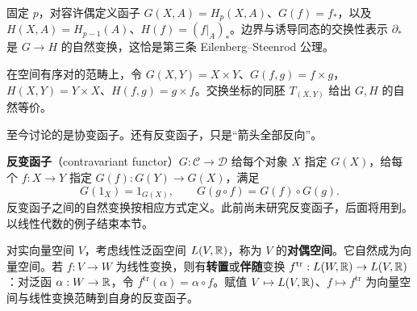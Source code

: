 固定 $p$，对容许偶定义函子 $G(X,A)=H_p(X,A)$、$G(f)=f_*$，以及 $H(X,A)=H_{p-1}(A)$、$H(f)=(f|_A)_*$。边界与诱导同态的交换性表示 $\partial_*$ 是 $G\to H$ 的自然变换，这恰是第三条 Eilenberg--Steenrod 公理。

在空间有序对的范畴上，令 $G(X,Y)=X\times Y$、$G(f,g)=f\times g$，$H(X,Y)=Y\times X$、$H(f,g)=g\times f$。交换坐标的同胚 $T_{(X,Y)}$ 给出 $G,H$ 的自然等价。

至今讨论的是协变函子。还有反变函子，只是“箭头全部反向”。

\textbf{反变函子}（contravariant functor）$G:\mathcal C\to\mathcal D$ 给每个对象 $X$ 指定 $G(X)$，给每个 $f:X\to Y$ 指定 $G(f):G(Y)\to G(X)$，满足
\[
G(1_X)=1_{G(X)},\qquad G(g\circ f)=G(f)\circ G(g).
\]
反变函子之间的自然变换按相应方式定义。此前尚未研究反变函子，后面将用到。以线性代数的例子结束本节。

对实向量空间 $V$，考虑线性泛函空间 $L(V,\mathbb{R})$，称为 $V$ 的\textbf{对偶空间}。它自然成为向量空间。若 $f:V\to W$ 为线性变换，则有\textbf{转置}或\textbf{伴随}变换 $f^{\mathrm{tr}}:L(W,\mathbb{R})\to L(V,\mathbb{R})$：对泛函 $\alpha:W\to\mathbb{R}$，令 $f^{\mathrm{tr}}(\alpha)=\alpha\circ f$。赋值 $V\mapsto L(V,\mathbb{R})$、$f\mapsto f^{\mathrm{tr}}$ 为向量空间与线性变换范畴到自身的反变函子。

